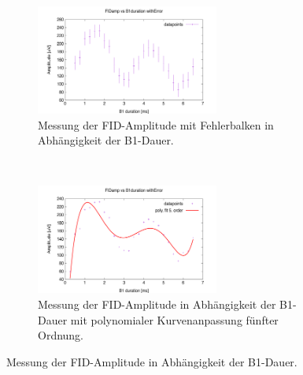\documentclass{article}
\begin{document}
        \begin{figure}
            \centering
            \begin{subfigure}[t]{0.45\textwidth}
                \centering
                \includegraphics[width=6cm]{../Bilddateien/B1DurationFast_FIDamp_vs_B1duration_withError.png}
                \caption{Messung der FID-Amplitude mit Fehlerbalken in Abhängigkeit der B1-Dauer.}
                \label{fig:5:FastFIDampVsB1durationWithError}
            \end{subfigure}
            \
            \begin{subfigure}[t]{0.45\textwidth}
                \centering
                \includegraphics[width=6cm]{../Bilddateien/B1DurationFast_FIDamp_vs_B1duration_withError_poly.png}
                \caption{Messung der FID-Amplitude in Abhängigkeit der B1-Dauer mit polynomialer Kurvenanpassung fünfter Ordnung.}
                \label{fig:5:FastFIDampVsB1duration}
            \end{subfigure}
            \caption{Messung der FID-Amplitude in Abhängigkeit der B1-Dauer.}
        \end{figure}
\end{document}
